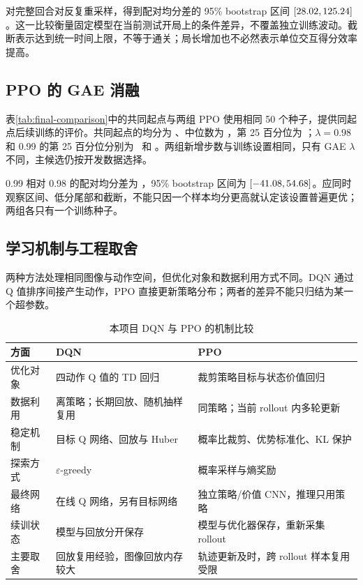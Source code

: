 对完整回合对反复重采样，得到配对均分差的 95\% bootstrap 区间 $[28.02,125.24]$。这一比较衡量固定模型在当前测试开局上的条件差异，不覆盖独立训练波动。截断表示达到统一时间上限，不等于通关；局长增加也不必然表示单位交互得分效率提高。

\subsection{PPO 的 GAE 消融}
表\ref{tab:final-comparison}中的共同起点与两组 PPO 使用相同 50 个种子，提供同起点后续训练的评价。共同起点的均分为 \SourceMean、中位数为 \SourceMedian，第 25 百分位为 \SourcePxxv；$\lambda=0.98$ 和 0.99 的第 25 百分位分别为 \PPOControlPxxv\ 和 \PPOGaePxxv。两组新增步数与训练设置相同，只有 GAE $\lambda$ 不同，主候选仍按开发数据选择。

0.99 相对 0.98 的配对均分差为 \GaeControlDiff，95\% bootstrap 区间为 $[-41.08,54.68]$。应同时观察区间、低分尾部和截断，不能只因一个样本均分更高就认定该设置普遍更优；两组各只有一个训练种子。

\subsection{学习机制与工程取舍}
两种方法处理相同图像与动作空间，但优化对象和数据利用方式不同。DQN 通过 Q 值排序间接产生动作，PPO 直接更新策略分布；两者的差异不能只归结为某一个超参数。

\begin{table}[!htbp]
 \centering\small
 \caption{本项目 DQN 与 PPO 的机制比较}\label{tab:method-comparison}
 \begin{tabularx}{\linewidth}{P{2.3cm}YY}
 \toprule
 方面 & DQN & PPO\\
 \midrule
 优化对象 & 四动作 Q 值的 TD 回归 & 裁剪策略目标与状态价值回归\\
 数据利用 & 离策略；长期回放、随机抽样复用 & 同策略；当前 rollout 内多轮更新\\
 稳定机制 & 目标 Q 网络、回放与 Huber & 概率比裁剪、优势标准化、KL 保护\\
 探索方式 & $\varepsilon$-greedy & 概率采样与熵奖励\\
 最终网络 & 在线 Q 网络，另有目标网络 & 独立策略/价值 CNN，推理只用策略\\
 续训状态 & 模型与回放分开保存 & 模型与优化器保存，重新采集 rollout\\
 主要取舍 & 回放复用经验，图像回放内存较大 & 轨迹更新及时，跨 rollout 样本复用受限\\
 \bottomrule
 \end{tabularx}
\end{table}

